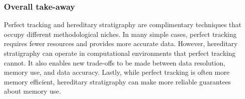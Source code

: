 
\subsubsection{Overall take-away}

Perfect tracking and hereditary stratigraphy are complimentary techniques that occupy different methodological niches.
In many simple cases, perfect tracking requires fewer resources and provides more accurate data.
However, hereditary stratigraphy can operate in computational environments that perfect tracking cannot.
It also enables new trade-offs to be made between data resolution, memory use, and data accuracy.
Lastly, while perfect tracking is often more memory efficient, hereditary stratigraphy can make more reliable guarantees about memory use.

